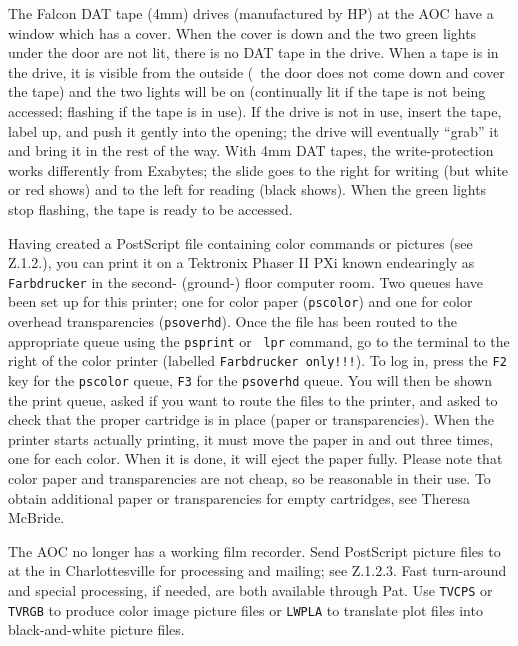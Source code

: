    The Falcon DAT tape (4mm) drives (manufactured by HP) at the AOC
have a window which has a cover.  When the cover is down and the two
green lights under the door are not lit, there is no DAT tape in the
drive.  When a tape is in the drive, it is visible from the outside
(\ie\ the door does not come down and cover the tape) and the two
lights will be on (continually lit if the tape is not being accessed;
flashing if the tape is in use).  If the drive is not in use, insert
the tape, label up, and push it gently into the opening; the drive
will eventually ``grab'' it and bring it in the rest of the way.  With
4mm DAT tapes, the write-protection works differently from Exabytes;
the slide goes to the right for writing (but white or red shows) and
to the left for reading (black shows).  When the green lights stop
flashing, the tape is ready to be accessed.


     Having created a PostScript file containing color commands or
pictures (see \Secs Z.1.2.), you can print it on a Tektronix Phaser II
PXi  known endearingly as {\tt Farbdrucker} in the
second- (ground-) floor computer room.  Two queues have been set up
for this printer; one for color paper ({\tt pscolor}) and one for
color overhead transparencies ({\tt psoverhd}).  Once the file has
been routed to the appropriate queue using the {\tt psprint} or {\tt
lpr} command, go to the terminal to the right of the color printer
(labelled {\tt Farbdrucker only!!!}).  To log in, press the {\tt F2}
key for the {\tt pscolor} queue, {\tt F3} for the {\tt psoverhd}
queue.  You will then be shown the print queue, asked if you want to
route the files to the printer, and asked to check that the proper
cartridge is in place (paper or transparencies).  When the printer
starts actually printing, it must move the paper in and out three
times, one for each color.  When it is done, it will eject the paper
fully.  Please note that color paper and transparencies are not cheap,
so be reasonable in their use.  To obtain additional paper or
transparencies for empty cartridges, see Theresa McBride.

     The AOC no longer has a working film recorder.  Send PostScript
picture files to  at the  in
Charlottesville for processing and mailing; see \Sec Z.1.2.3.  Fast
turn-around and special processing, if needed, are both available
through Pat.  Use {\tt TVCPS} or {\tt TVRGB} to produce color image
picture files or {\tt LWPLA} to translate plot files into
black-and-white picture files.

